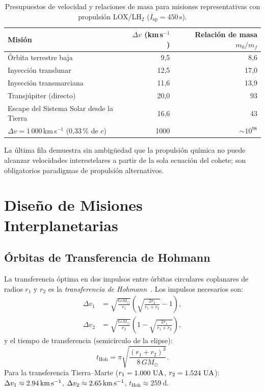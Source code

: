 \documentclass[12pt,a4paper]{article}
\newcommand{\AU}{\,\text{UA}}
\begin{document}
\begin{table}[h]
  \centering
  \caption{Presupuestos de velocidad y relaciones de masa para misiones
           representativas con propulsión LOX/LH$_2$
           ($I_{\mathrm{sp}} = 450$\,s).}
  \label{tab:dv_es}
  \begin{tabularx}{\textwidth}{Xrr}
    \toprule
    Misión & $\Delta v$ (km\,s$^{-1}$) & Relación de masa $m_0/m_f$ \\
    \midrule
    Órbita terrestre baja & 9{,}5  & 8{,}6   \\
    Inyección translunar & 12{,}5 & 17{,}0 \\
    Inyección transmarciana & 11{,}6 & 13{,}9 \\
    Transjúpiter (directo) & 20{,}0 & 93    \\
    Escape del Sistema Solar desde la Tierra & 16{,}6 & 43    \\
    $\Delta v = 1\,000$\,km\,s$^{-1}$ (0{,}33\,\% de $c$) &
    \num{1000} & $\sim 10^{98}$ \\
    \bottomrule
  \end{tabularx}
\end{table}

La última fila demuestra sin ambigüedad que la propulsión química no puede
alcanzar velocidades interestelares a partir de la sola ecuación del cohete;
son obligatorios paradigmas de propulsión alternativos.

\section{Diseño de Misiones Interplanetarias}

\subsection{Órbitas de Transferencia de Hohmann}

La transferencia óptima en dos impulsos entre órbitas circulares coplanares
de radios $r_1$ y $r_2$ es la \emph{transferencia de Hohmann}~\citep{Hohmann1925}. Los impulsos
necesarios son:
\begin{align}
  \Delta v_1 &= \sqrt{\frac{GM_\odot}{r_1}}
               \left(\sqrt{\frac{2r_2}{r_1+r_2}} - 1\right),\\
  \Delta v_2 &= \sqrt{\frac{GM_\odot}{r_2}}
               \left(1 - \sqrt{\frac{2r_1}{r_1+r_2}}\right),
\end{align}
y el tiempo de transferencia (semicírculo de la elipse):
\begin{equation}
  t_{\mathrm{Hoh}} = \pi\sqrt{\frac{(r_1+r_2)^3}{8\,GM_\odot}}.
\end{equation}
Para la transferencia Tierra--Marte ($r_1 = \SI{1{,}000}{\AU}$,
$r_2 = \SI{1{,}524}{\AU}$): $\Delta v_1 \approx \SI{2{,}94}{\kilo\meter\per\second}$,
$\Delta v_2 \approx \SI{2{,}65}{\kilo\meter\per\second}$,
$t_{\mathrm{Hoh}} \approx \SI{259}{\day}$.
\end{document}
